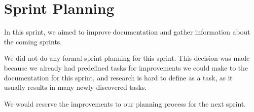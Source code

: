 \section{Sprint Planning}
In this sprint, we aimed to improve documentation and gather information about the coming sprints.

We did not do any formal sprint planning for this sprint. This decision was made because we already had predefined tasks for improvements we could make to the documentation for this sprint, and research is hard to define as a task, as it usually results in many newly discovered tasks.

We would reserve the improvements to our planning process for the next sprint.

